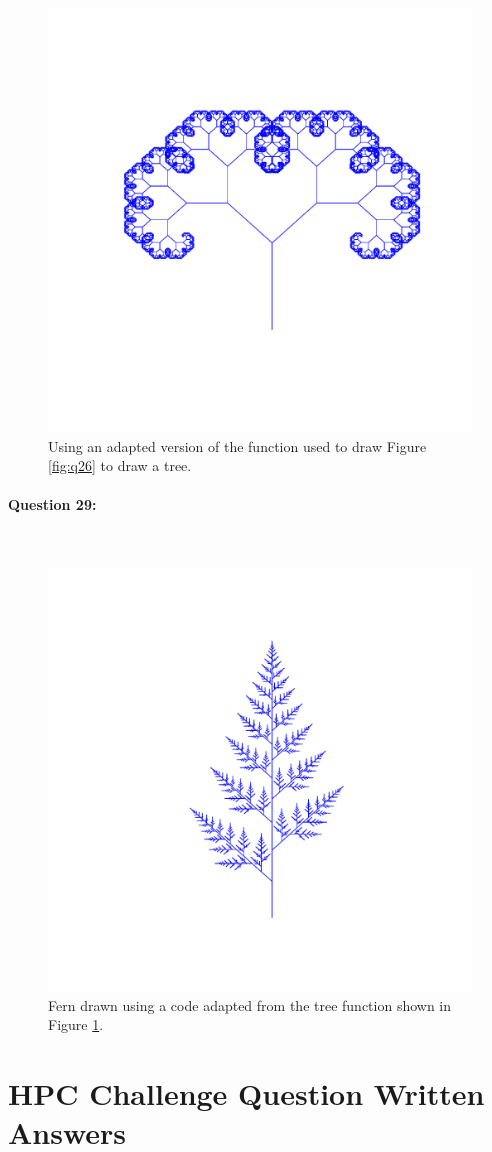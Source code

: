 \documentclass{article}
\begin{document}
\begin{figure}[H]
	\centering
	\includegraphics[width=0.5\linewidth,trim={3cm 3cm 2cm 2cm},clip]{../Results/tree.pdf}
	\caption{Using an adapted version of the function used to draw Figure \ref{fig:q26} to draw a tree.}
	\label{fig:q27}
\end{figure}

\newpage

\paragraph{Question 29:}\	


\begin{figure}[H]
	\centering
	\includegraphics[width=0.5\linewidth,trim={3cm 3cm 2cm 2cm},clip]{../Results/fern_2.pdf}
	\caption{Fern drawn using a code adapted from the tree function shown in Figure \ref{fig:q27}.}
	\label{fig:q29}
\end{figure}

\newpage
\section*{HPC Challenge Question Written Answers}
 
\end{document}
